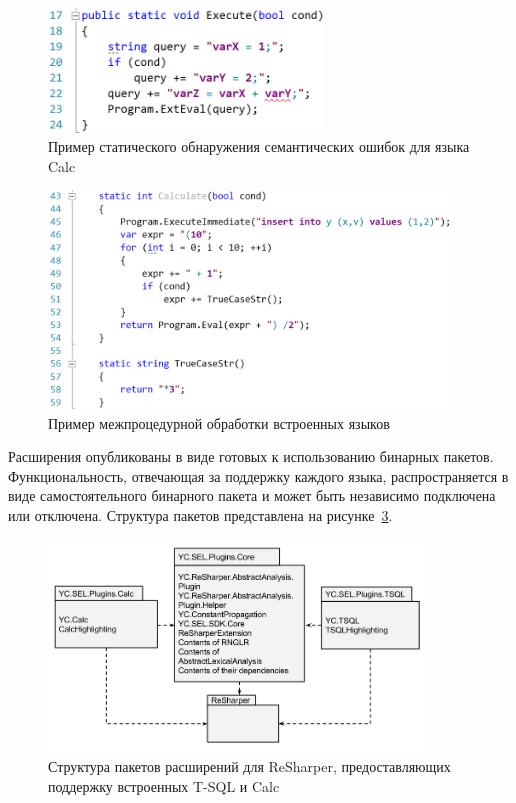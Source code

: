 \begin{figure}[H]
  \centering
 \includegraphics[width=0.65\textwidth]{pics/undefined_variable.png}
 \caption{Пример статического обнаружения семантических ошибок для языка Calc}
 \label{fig:undeclaredVars}
\end{figure}

\begin{figure}[H]
  \centering
 \includegraphics[width=0.95\textwidth]{pics/sql_calc_cycle.png}
 \caption{Пример межпроцедурной обработки встроенных языков}
 \label{fig:interProc}
\end{figure}

Расширения опубликованы в виде готовых к использованию бинарных пакетов. Функциональность, отвечающая за поддержку каждого языка, распространяется в виде самостоятельного бинарного пакета и может быть независимо подключена или отключена. Структура пакетов представлена на рисунке~\ref{fig:packagesStructure}.

\begin{figure}[H]
  \centering
 \includegraphics[width=0.90\textwidth]{pics/RshPluginsPackages.png}
 \caption{Структура пакетов расширений для ReSharper, предоставляющих поддержку встроенных T-SQL и Calc}
 \label{fig:packagesStructure}
\end{figure}

